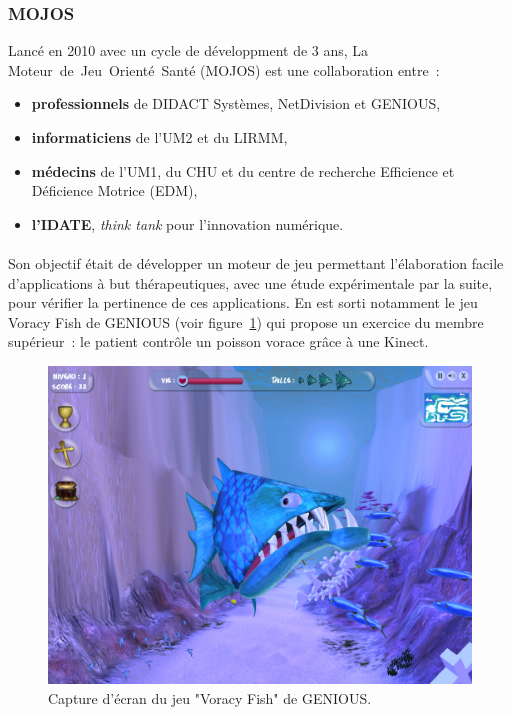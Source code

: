 
\subsubsection{MOJOS}
Lancé en 2010 avec un cycle de développment de 3 ans, 
La Moteur~de~Jeu~Orienté~Santé (MOJOS) est une collaboration entre~:
\begin{itemize}
\item \textbf{professionnels} de DIDACT Systèmes, NetDivision et GENIOUS,
\item \textbf{informaticiens} de l'UM2 et du LIRMM,
\item \textbf{médecins} de l'UM1, du CHU et du centre 
de recherche Efficience et Déficience Motrice (EDM),
\item \textbf{l'IDATE}, \emph{think tank} pour l'innovation numérique.
\end{itemize}

\paragraph{}
Son objectif était de développer un moteur de jeu permettant 
l'élaboration facile d'applications à but thérapeutiques, avec une étude 
expérimentale
par la suite, pour vérifier la pertinence de ces applications. En est sorti 
notamment le jeu Voracy Fish de GENIOUS (voir figure~\ref{fig:voracy_fish})
qui propose un exercice du membre supérieur~: le patient contrôle un poisson 
vorace grâce à une Kinect.

\begin{figure}[h!]
\centering
\includegraphics[width=0.8\linewidth]{images/voracy_fish}
\caption{Capture d'écran du jeu "Voracy Fish" de GENIOUS.}
\label{fig:voracy_fish}
\end{figure}

